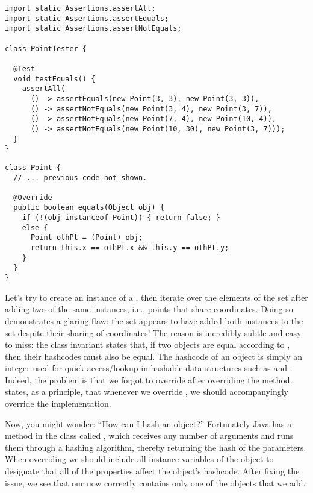 \begin{lstlisting}[language=MyJava]
import static Assertions.assertAll;
import static Assertions.assertEquals;
import static Assertions.assertNotEquals;

class PointTester {

  @Test
  void testEquals() {
    assertAll(
      () -> assertEquals(new Point(3, 3), new Point(3, 3)),
      () -> assertNotEquals(new Point(3, 4), new Point(3, 7)),
      () -> assertNotEquals(new Point(7, 4), new Point(10, 4)),
      () -> assertNotEquals(new Point(10, 30), new Point(3, 7)));
  }
}
\end{lstlisting}

\begin{lstlisting}[language=MyJava]
class Point {
  // ... previous code not shown.

  @Override
  public boolean equals(Object obj) {
    if (!(obj instanceof Point)) { return false; }
    else {
      Point othPt = (Point) obj;
      return this.x == othPt.x && this.y == othPt.y;
    }
  }
}
\end{lstlisting}

Let's try to create an instance of a , then iterate over the elements of the set after adding two of the same  instances, i.e., points that share coordinates. Doing so demonstrates a glaring flaw: the set appears to have added both  instances to the set despite their sharing of coordinates! The reason is incredibly subtle and easy to miss: the  class invariant states that, if two objects are equal according to , then their hashcodes must also be equal. The hashcode of an object is simply an integer used for quick access/lookup in hashable data structures such as  and . Indeed, the problem is that we forgot to override  after overriding the  method. \cite{effectivejava} states, as a principle, that whenever we override , we should accompanyingly override the  implementation. 

Now, you might wonder: ``How can I hash an object?'' Fortunately Java has a method in the  class called , which receives any number of arguments and runs them through a hashing algorithm, thereby returning the hash of the parameters. When overriding  we should include all instance variables of the object to designate that all of the properties affect the object's hashcode. After fixing the issue, we see that our  now correctly contains only one of the  objects that we add.

